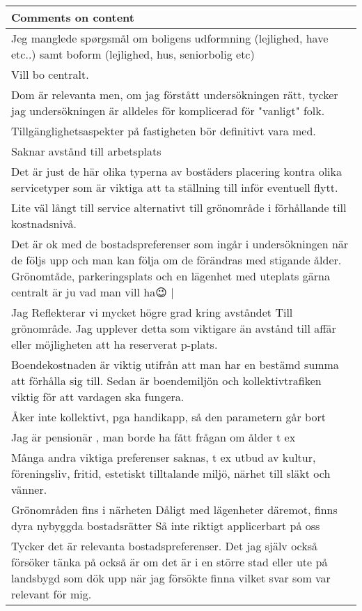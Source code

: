 \documentclass[
]{article}
\begin{document}
\begin{longtable}[t]{l}
\caption{\label{tab:unnamed-chunk-1}}\\
\toprule
Comments on content\\
\midrule
Jeg manglede spørgsmål om boligens udformning (lejlighed, have etc..) samt boform (lejlighed, hus, seniorbolig etc)\\
Vill bo centralt.\\
Dom är relevanta men, om jag förstått undersökningen rätt, tycker jag undersökningen är alldeles för komplicerad för "vanligt" folk.\\
Tillgänglighetsaspekter på fastigheten bör definitivt vara med.\\
Saknar avstånd till arbetsplats\\
\addlinespace
Det är just de här olika typerna av bostäders placering kontra olika servicetyper som är viktiga att ta ställning till inför eventuell flytt.\\
Lite väl långt till service alternativt till grönområde i förhållande till kostnadsnivå.\\
Det är ok med de bostadspreferenser som ingår i undersökningen när de följs upp och man kan följa om de förändras med stigande ålder. Grönomtåde, parkeringsplats och en lägenhet med uteplats gärna centralt är ju vad man vill ha😉 |\\
Jag Reflekterar vi mycket högre grad kring avståndet Till grönområde. Jag upplever detta som viktigare än avstånd till affär eller möjligheten att ha reserverat p-plats.\\
Boendekostnaden är viktig utifrån att man har en bestämd summa att förhålla sig till. Sedan är boendemiljön och kollektivtrafiken viktig för att vardagen ska fungera.\\
\addlinespace
Åker inte kollektivt, pga handikapp, så den parametern går bort\\
Jag är pensionär , man borde ha fått frågan om ålder t ex\\
Många andra viktiga preferenser saknas, t ex utbud av kultur, föreningsliv, fritid, estetiskt tilltalande miljö, närhet till släkt och vänner.\\
Grönområden fins i närheten 
Dåligt med lägenheter däremot, finns dyra nybyggda bostadsrätter 
Så inte riktigt applicerbart på oss\\
Tycker det är relevanta bostadspreferenser. Det jag själv också försöker tänka på också är om det är i en större stad eller ute på landsbygd som dök upp när jag försökte finna vilket svar som var relevant för mig.\\
\bottomrule
\end{longtable}
\end{document}
